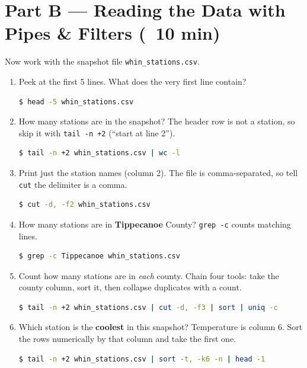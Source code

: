 \documentclass[11pt]{article}
\begin{document}
\section{Part B --- Reading the Data with Pipes \& Filters (~10 min)}
Now work with the snapshot file \texttt{whin\_stations.csv}.

\begin{enumerate}[label=\textbf{B\arabic*.}]
    \item Peek at the first 5 lines. What does the very first line contain?
\begin{lstlisting}[language=bash]
$ head -5 whin_stations.csv
\end{lstlisting}

    \item How many stations are in the snapshot? The header row is not a station, so skip it with \texttt{tail -n +2} (``start at line 2'').
\begin{lstlisting}[language=bash]
$ tail -n +2 whin_stations.csv | wc -l
\end{lstlisting}

    \item Print just the station names (column 2). The file is comma-separated, so tell \texttt{cut} the delimiter is a comma.
\begin{lstlisting}[language=bash]
$ cut -d, -f2 whin_stations.csv
\end{lstlisting}

    \item How many stations are in \textbf{Tippecanoe} County? \texttt{grep -c} counts matching lines.
\begin{lstlisting}[language=bash]
$ grep -c Tippecanoe whin_stations.csv
\end{lstlisting}

    \item Count how many stations are in \textit{each} county. Chain four tools: take the county column, sort it, then collapse duplicates with a count.
\begin{lstlisting}[language=bash]
$ tail -n +2 whin_stations.csv | cut -d, -f3 | sort | uniq -c
\end{lstlisting}

    \item Which station is the \textbf{coolest} in this snapshot? Temperature is column 6. Sort the rows numerically by that column and take the first one.
\begin{lstlisting}[language=bash]
$ tail -n +2 whin_stations.csv | sort -t, -k6 -n | head -1
\end{lstlisting}
\end{enumerate}
\end{document}
